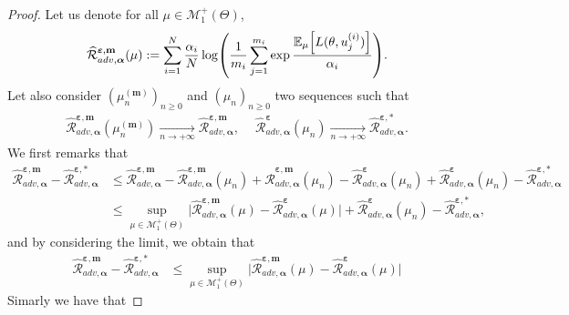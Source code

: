 \begin{proof}
Let us denote for all $\mu\in\mathcal{M}_1^{+}(\Theta)$,
\begin{align*}
  \widehat{\mathcal{R}}^{\bm{\varepsilon},\textbf{m}}_{adv,\bm{\alpha}}(\mu):=  \sum_{i=1}^\numsamples  \frac{\alpha_i}{\numsamples}\log\left( \frac{1}{m_i}\sum_{j=1}^{m_i}\exp\frac{\mathbb{E}_{ \mu}\left[\loss(\theta,u_j^{(i)})\right]}{\alpha_i}\right).
\end{align*}
Let also consider $(\mu^{(\textbf{m})}_n)_{n\geq 0}$ and $(\mu_n)_{n\geq 0}$ two sequences such that
\begin{align*}
 \widehat{\mathcal{R}}^{\bm{\varepsilon},\textbf{m}}_{adv,\bm{\alpha}}(\mu^{(\textbf{m})}_n) \xrightarrow[n \to +\infty]{}\widehat{\mathcal{R}}^{\bm{\varepsilon},\textbf{m}}_{adv,\bm{\alpha}},~\quad
\widehat{\mathcal{R}}^{\bm{\varepsilon}}_{adv,\bm{\alpha}}(\mu_n)\xrightarrow[n \to +\infty]{}\widehat{\mathcal{R}}^{\bm{\varepsilon},*}_{adv,\bm{\alpha}}.
\end{align*}
We first remarks that
\begin{align*}
\widehat{\mathcal{R}}^{\bm{\varepsilon},\textbf{m}}_{adv,\bm{\alpha}}- \widehat{\mathcal{R}}^{\bm{\varepsilon},*}_{adv,\bm{\alpha}}&\leq \widehat{\mathcal{R}}^{\bm{\varepsilon},\textbf{m}}_{adv,\bm{\alpha}} - \widehat{\mathcal{R}}^{\bm{\varepsilon},\textbf{m}}_{adv,\bm{\alpha}}(\mu_n) + \widehat{\mathcal{R}}^{\bm{\varepsilon},\textbf{m}}_{adv,\bm{\alpha}}(\mu_n) - \widehat{\mathcal{R}}^{\bm{\varepsilon}}_{adv,\bm{\alpha}}(\mu_n)+ \widehat{\mathcal{R}}^{\bm{\varepsilon}}_{adv,\bm{\alpha}}(\mu_n)-
\widehat{\mathcal{R}}^{\bm{\varepsilon},*}_{adv,\bm{\alpha}} \\
&\leq \sup_{\mu\in \mathcal{M}^+_1(\Theta)}\Big|\widehat{\mathcal{R}}^{\bm{\varepsilon},\textbf{m}}_{adv,\bm{\alpha}}(\mu) - \widehat{\mathcal{R}}^{\bm{\varepsilon}}_{adv,\bm{\alpha}}(\mu) \Big| + \widehat{\mathcal{R}}^{\bm{\varepsilon}}_{adv,\bm{\alpha}}(\mu_n)-
\widehat{\mathcal{R}}^{\bm{\varepsilon},*}_{adv,\bm{\alpha}},
\end{align*}
and by considering the limit, we obtain that
\begin{align*}
  \widehat{\mathcal{R}}^{\bm{\varepsilon},\textbf{m}}_{adv,\bm{\alpha}}- \widehat{\mathcal{R}}^{\bm{\varepsilon},*}_{adv,\bm{\alpha}}&\leq  \sup_{\mu\in \mathcal{M}^+_1(\Theta)}\Big|\widehat{\mathcal{R}}^{\bm{\varepsilon},\textbf{m}}_{adv,\bm{\alpha}}(\mu) - \widehat{\mathcal{R}}^{\bm{\varepsilon}}_{adv,\bm{\alpha}}(\mu) \Big| 
\end{align*}
Simarly we have that

\end{proof}
